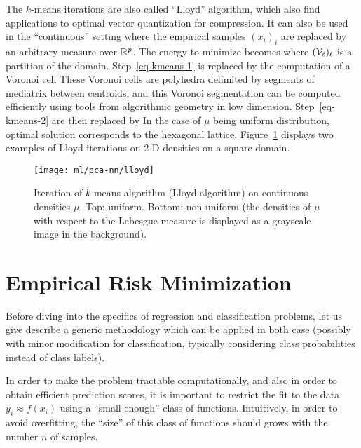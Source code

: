 The $k$-means iterations are also called ``Lloyd'' algorithm, which also find applications to optimal vector quantization for compression. It can also be used in the ``continuous'' setting where the empirical samples $(x_i)_i$ are replaced by an arbitrary measure over $\mathbb{R}^p$. 
%
The energy to minimize becomes
where $(\mathcal{V}_\ell)_\ell$ is a partition of the domain. 
%
Step~\eqref{eq-kmeans-1} is replaced by the computation of a Voronoi cell
These Voronoi cells are polyhedra delimited by segments of mediatrix between centroids, and this Voronoi segmentation can be computed efficiently using tools from algorithmic geometry in low dimension. 
%
Step~\eqref{eq-kmeans-2} are then replaced by
In the case of $\mu$ being uniform distribution, optimal solution corresponds to the hexagonal lattice.
%
Figure~\ref{fig-lloyd} displays two examples of Lloyd iterations on 2-D densities on a square domain.

\begin{figure}
\centering
\texttt{[image: ml/pca-nn/lloyd]}
\caption{\label{fig-lloyd}
Iteration of $k$-means algorithm (Lloyd algorithm) on continuous densities $\mu$. Top: uniform. Bottom: non-uniform (the densities of $\mu$ with respect to the Lebesgue measure is displayed as a grayscale image in the background).
}
\end{figure}




\section{Empirical Risk Minimization}

Before diving into the specifics of regression and classification problems, let us give describe a generic methodology which can be applied in both case (possibly with minor modification for classification, typically considering class probabilities instead of class labels).

In order to make the problem tractable computationally, and also in order to obtain efficient prediction scores, it is important to restrict the fit to the data $y_i \approx f(x_i)$ using a ``small enough'' class of functions. Intuitively, in order to avoid overfitting, the ``size'' of this class of functions should grows with the number $n$ of samples. 

